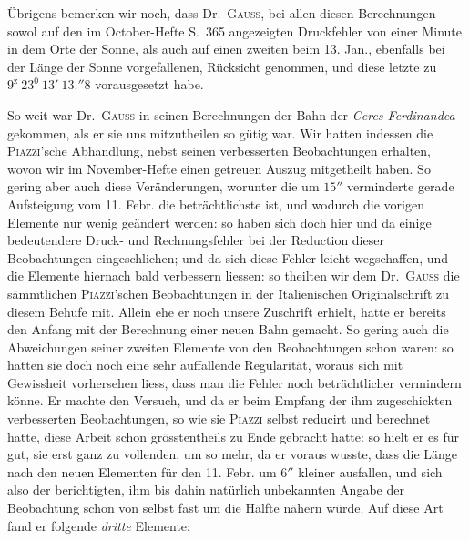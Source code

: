 Übrigens bemerken wir noch, dass Dr.\ \textsc{Gauss}, bei allen diesen Berechnungen sowol auf den im October-Hefte S.\ 365 angezeigten Druckfehler von einer Minute in dem Orte der Sonne, als auch auf einen zweiten beim 13. Jan., ebenfalls bei der Länge der Sonne vorgefallenen, Rücksicht genommen, und diese letzte zu $9^{\mathrm z}\ 23^0\ 13'\ 13.''8$ vorausgesetzt habe.

So weit war Dr.\ \textsc{Gauss} in seinen Berechnungen der Bahn der \textit{Ceres Ferdinandea} gekommen, als er sie uns mitzutheilen so gütig war. Wir hatten indessen die \textsc{Piazzi}'sche Abhandlung, nebst seinen verbesserten Beobachtungen erhalten, wovon wir im November-Hefte einen getreuen Auszug mitgetheilt haben. So gering aber auch diese Veränderungen, worunter die um $15''$ verminderte gerade Aufsteigung vom 11. Febr. die beträchtlichste ist, und wodurch die vorigen Elemente nur wenig geändert werden: so haben sich doch hier und da einige bedeutendere Druck- und Rechnungsfehler bei der Reduction dieser Beobachtungen eingeschlichen; und da sich diese Fehler leicht wegschaffen, und die Elemente hiernach bald verbessern liessen: so theilten wir dem Dr.\ \textsc{Gauss} die sämmtlichen \textsc{Piazzi}'schen Beobachtungen in der Italienischen Originalschrift zu diesem Behufe mit. Allein ehe er noch unsere Zuschrift erhielt, hatte er bereits den Anfang mit der Berechnung einer neuen Bahn gemacht. So gering auch die Abweichungen seiner zweiten Elemente von den Beobachtungen schon waren: so hatten sie doch noch eine sehr auffallende Regularität, woraus sich mit Gewissheit vorhersehen liess, dass man die Fehler noch beträchtlicher vermindern könne. Er machte den Versuch, und da er beim Empfang der ihm zugeschickten verbesserten Beobachtungen, so wie sie \textsc{Piazzi} selbst reducirt und berechnet hatte, diese Arbeit schon grösstentheils zu Ende gebracht hatte: so hielt er es für gut, sie erst ganz zu vollenden, um so mehr, da er voraus wusste, dass die Länge nach den neuen Elementen für den 11. Febr. um $6''$ kleiner ausfallen, und sich also der berichtigten, ihm bis dahin natürlich unbekannten Angabe der Beobachtung schon von selbst fast um die Hälfte nähern würde. Auf diese Art fand er folgende \textit{dritte} Elemente:
